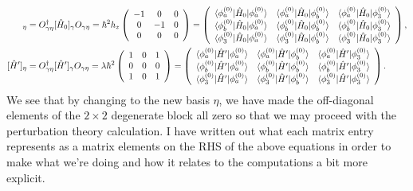 \documentclass[10pt]{article}
\newcommand{\1}{\mathbf 1}
\begin{document}
\begin{align}
	[\hat H_0]_\eta
	&=
	O_{\gamma\eta}^\dagger
	[\hat H_0]_\gamma
	O_{\gamma\eta}
	=
	\hbar^2 h_z
	\left(
\begin{array}{ccc}
 -1 & 0 & 0 \\
 0 & -1 & 0 \\
 0 & 0 & 0 \\
\end{array}
\right)
=
\left(
	\begin{array}{ccc}
		\braket{\phi_a^{(0)} | \hat H_0 | \phi_a^{(0)}}
		&
		\braket{\phi_a^{(0)} | \hat H_0 | \phi_b^{(0)}}
		&
		\braket{\phi_a^{(0)} | \hat H_0 | \phi_3^{(0)}}
		\\
		\braket{\phi_b^{(0)} | \hat H_0 | \phi_a^{(0)}}
		&
		\braket{\phi_b^{(0)} | \hat H_0 | \phi_b^{(0)}}
		&
		\braket{\phi_b^{(0)} | \hat H_0 | \phi_3^{(0)}}
		\\
		\braket{\phi_3^{(0)} | \hat H_0 | \phi_a^{(0)}}
		&
		\braket{\phi_3^{(0)} | \hat H_0 | \phi_b^{(0)}}
		&
		\braket{\phi_3^{(0)} | \hat H_0 | \phi_3^{(0)}}
		\\
	\end{array}
\right)
,
\\
[\hat H']_\eta
&=
O_{\gamma\eta}^\dagger
[\hat H']_\gamma
O_{\gamma\eta}
=
\lambda\hbar^2
\left(
\begin{array}{ccc}
 1 & 0 & 1 \\
 0 & 0 & 0 \\
 1 & 0 & 1 \\
\end{array}
\right)
=
\left(
	\begin{array}{ccc}
		\braket{\phi_a^{(0)} | \hat H' | \phi_a^{(0)}}
		&
		\braket{\phi_a^{(0)} | \hat H' | \phi_b^{(0)}}
		&
		\braket{\phi_a^{(0)} | \hat H' | \phi_3^{(0)}}
		\\
		\braket{\phi_b^{(0)} | \hat H' | \phi_a^{(0)}}
		&
		\braket{\phi_b^{(0)} | \hat H' | \phi_b^{(0)}}
		&
		\braket{\phi_b^{(0)} | \hat H' | \phi_3^{(0)}}
		\\
		\braket{\phi_3^{(0)} | \hat H' | \phi_a^{(0)}}
		&
		\braket{\phi_3^{(0)} | \hat H' | \phi_b^{(0)}}
		&
		\braket{\phi_3^{(0)} | \hat H' | \phi_3^{(0)}}
		\\
	\end{array}
\right).
\end{align}
We see that by changing to the new basis $\eta$, we have made the off-diagonal elements of the $2 \times 2$ degenerate block all zero so that we may proceed with the perturbation theory calculation.
I have written out what each matrix entry represents as a matrix elements on the RHS of the above equations in order to make what we're doing and how it relates to the computations a bit more explicit.
\end{document}
